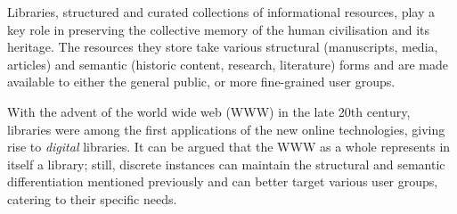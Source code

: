 Libraries, structured and curated collections of informational resources, play a key role in preserving the collective memory of the human civilisation and its heritage. The resources they store take various structural (manuscripts, media, articles) and semantic (historic content, research, literature) forms and are made available to either the general public, or more fine-grained user groups.

With the advent of the world wide web (WWW) in the late 20th century, libraries were among the first applications of the new online technologies, giving rise to \emph{digital} libraries. It can be argued that the WWW as a whole represents in itself a library; still, discrete instances can maintain the structural and semantic differentiation mentioned previously and can better target various user groups, catering to their specific needs.

